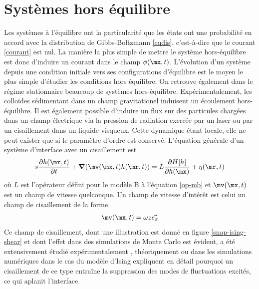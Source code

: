     \section{Systèmes hors équilibre}

Les systèmes à l'équilibre ont la particularité que les états ont une probabilité en accord avec la distribution de Gibbs-Boltzmann \ref{eqdis}, c'est-à-dire que le courant \ref{courant} est nul. La manière la plus simple de mettre le système hors-équilibre est donc d'induire un courant dans le champ $\phi(\mx,t)$. L'évolution d'un système depuis une condition initiale vers ses configurations d'équilibre est le moyen le plus simple d'étudier les conditions hors équilibre. On retrouve également dans le régime stationnaire beaucoup de systèmes hors-équilibre. Expérimentalement, les colloïdes sédimentant dans un champ gravitationel induisent un écoulement hors-équilibre. Il est également possible d'induire un flux sur des particules chargées dans un champ électrique via la pression de radiation exercée par un laser ou par un cisaillement dans un liquide visqueux\cite{girot_conical_2019}. Cette dynamique étant locale, elle ne peut exister que si le paramètre d'ordre est conservé. L'équation générale d'un système d'interface avec un cisaillement est\cite{bray_interface_2001-1,bray_interface_2001}
\begin{align}s
     \frac{\partial h(\mr,t)}{\partial t} + {\boldsymbol \nabla} (\mv(\mx,t) h(\mr,t)) =  L \frac{\partial H[h]}{\partial h(\mx)} +  \eta(\mr,t)
\end{align}
où $L$ est l'opérateur défini pour le modèle B à l'équation \ref{op-mb} et $\mv(\mx,t)$ est un champ de vitesse quelconque. 
Un champ de vitesse d'intérêt est celui un champ de cisaillement de la forme 
\begin{align}
    \mv(\mx,t) = \omega z \vec{e_x}
     \label{eq-cisaillement}    
\end{align}
Ce champ de cisaillement, dont une illustration est donné en figure \ref{snap-ising-shear} et dont l'effet dans des simulations de Monte Carlo est évident, a été extensivement étudié expérimentalement \cite{derks_suppression_2006}, théoriquement \cite{leung_field_1986,bray_coarsening_2000,bray_interface_2001-1,bray_interface_2001} ou dans les simulations numériques dans le cas du modèle d'Ising \cite{gonnella_nonequilibrium_2009,smith_driven_2010,smith_interfaces_2008,sadhu_non-local_2014,cohen_interface_2016,cirillo_monte_2005} expliquent en détail pourquoi un cisaillement de ce type entraîne la suppression des modes de fluctuations excités, ce qui aplanit l'interface. 


